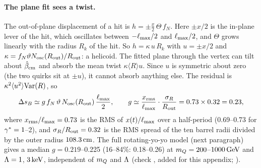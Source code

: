 \paragraph{The plane fit sees a twist.} The out-of-plane displacement of a hit is $h=\pm\tfrac{x}{2}\,\Theta\,f_N$. Here
$\pm x/2$ is the in-plane lever of the hit, which oscillates between $-\ell_{\max}/2$ and $\ell_{\max}/2$, and $\Theta$ grows
linearly with the radius $R_k$ of the hit. So $h=\kappa\,u\,R_k$ with $u=\pm x/2$ and
$\kappa=f_N\vartheta N_{\rm osc}(R_{\rm out})/R_{\rm out}$: a helicoid. The fitted plane through the vertex can tilt about
$\hat\beta_{\rm cm}$ and absorb the mean twist $\kappa\langle R\rangle u$. Since $u$ is symmetric about zero (the two
quirks sit at $\pm u$), it cannot absorb anything else. The residual is $\kappa^2\langle u^2\rangle{\rm Var}(R)$, so
\begin{equation}
  \Delta s_B\simeq g\,f_N\,\vartheta\,N_{\rm osc}(R_{\rm out})\,\frac{\ell_{\max}}{2},\qquad
  g\simeq\frac{x_{\rm rms}}{\ell_{\max}}\cdot\frac{\sigma_R}{R_{\rm out}}=0.73\times0.32=0.23 ,
  \label{eq:D:g}
\end{equation}
where $x_{\rm rms}/\ell_{\max}=0.73$ is the RMS of $x(t)/\ell_{\max}$ over a half-period (0.69--0.73 for $\gamma^*=1$--2), and
$\sigma_R/R_{\rm out}=0.32$ is the RMS spread of the ten barrel radii divided by the outer radius $108.3\,\mathrm{cm}$. The full
rotating-yo-yo model (next paragraph) gives a median $g=0.219$--0.225 (16--84\%: 0.18--0.26) at $m_Q=200$--$1000\,\mathrm{GeV}$ and
$\Lambda=1$, $3\,\mathrm{keV}$, independent of $m_Q$ and $\Lambda$ (check , added for this appendix; \EST{}).

